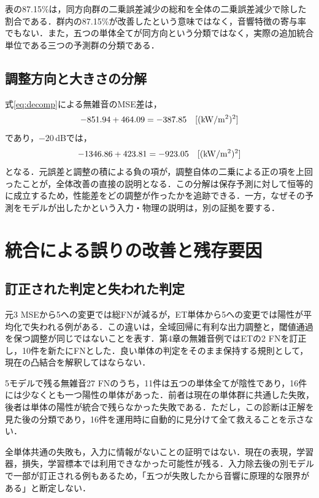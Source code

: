 表の87.15\%は，同方向群の二乗誤差減少の総和を全体の二乗誤差減少で除した割合である．群内の87.15\%が改善したという意味ではなく，音響特徴の寄与率でもない．また，五つの単体全てが同方向という分類ではなく，実際の追加統合単位である三つの予測群の分類である．

\subsection{調整方向と大きさの分解}
式\eqref{eq:decomp}による無雑音のMSE差は，
\begin{equation}
 -851.94+464.09=-387.85\quad[(\mathrm{kW/m^2})^2{}]
\end{equation}
であり，$-20$\,dBでは，
\begin{equation}
 -1346.86+423.81=-923.05\quad[(\mathrm{kW/m^2})^2{}]
\end{equation}
となる\cite{localLink}．元誤差と調整の積による負の項が，調整自体の二乗による正の項を上回ったことが，全体改善の直接の説明となる．この分解は保存予測に対して恒等的に成立するため，性能差をどの調整が作ったかを追跡できる．一方，なぜその予測をモデルが出したかという入力・物理の説明は，別の証拠を要する．

\section{統合による誤りの改善と残存要因}
\subsection{訂正された判定と失われた判定}
元3 MSEから5への変更では総FNが減るが，ET単体から5への変更では陽性が平均化で失われる例がある．この違いは，全域回帰に有利な出力調整と，閾値通過を保つ調整が同じではないことを表す．第4章の無雑音例ではETの2 FNを訂正し，10件を新たにFNとした．良い単体の判定をそのまま保持する規則として，現在の凸結合を解釈してはならない．

5モデルで残る無雑音27 FNのうち，11件は五つの単体全てが陰性であり，16件には少なくとも一つ陽性の単体があった\cite{localMainRun}．前者は現在の単体群に共通した失敗，後者は単体の陽性が統合で残らなかった失敗である．ただし，この診断は正解を見た後の分類であり，16件を運用時に自動的に見分けて全て救えることを示さない．

全単体共通の失敗も，入力に情報がないことの証明ではない．現在の表現，学習器，損失，学習標本では利用できなかった可能性が残る．入力除去後の別モデルで一部が訂正される例もあるため，「五つが失敗したから音響に原理的な限界がある」と断定しない．

